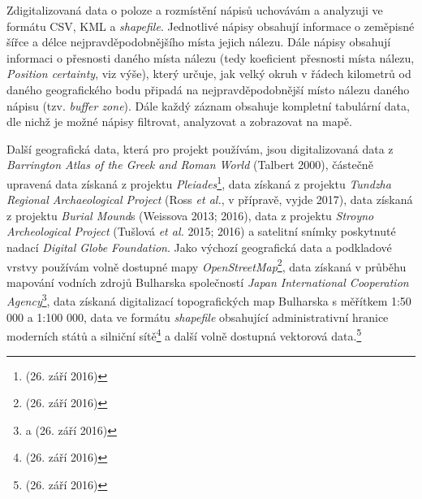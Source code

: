 Zdigitalizovaná data o poloze a rozmístění nápisů uchovávám a analyzuji ve formátu CSV, KML a {\em shapefile}. Jednotlivé nápisy obsahují informace o zeměpisné šířce a délce nejpravděpodobnějšího místa jejich nálezu. Dále nápisy obsahují informaci o přesnosti daného místa nálezu (tedy koeficient přesnosti místa nálezu, {\em Position certainty}, viz výše), který určuje, jak velký okruh v řádech kilometrů od daného geografického bodu připadá na nejpravděpodobnější místo nálezu daného nápisu (tzv. {\em buffer zone}). Dále každý záznam obsahuje kompletní tabulární data, dle nichž je možné nápisy filtrovat, analyzovat a zobrazovat na mapě.

Další geografická data, která pro projekt používám, jsou digitalizovaná data z {\em Barrington Atlas of the Greek and Roman World} (Talbert 2000), částečně upravená data získaná z projektu {\em Pleiades}\footnote{\from[url9] (26. září 2016)}, data získaná z projektu {\em Tundzha Regional Archaeological Project} (Ross {\em et al.}, v přípravě, vyjde 2017), data získaná z projektu {\em Burial Mound}s (Weissova 2013; 2016), data z projektu {\em Stroyno Archeological Project} (Tušlová {\em et al.} 2015; 2016) a satelitní snímky poskytnuté nadací {\em Digital Globe Foundation}. Jako výchozí geografická data a podkladové vrstvy používám volně dostupné mapy {\em OpenStreetMap}\footnote{\from[url10] (26. září 2016)}, data získaná v průběhu mapování vodních zdrojů Bulharska společností {\em Japan International Cooperation Agency}\footnote{\from[url11] a \from[url12] (26. září 2016)}, data získaná digitalizací topografických map Bulharska s měřítkem 1:50 000 a 1:100 000, data ve formátu {\em shapefile} obsahující administrativní hranice moderních států a silniční sítě\footnote{\from[url13] (26. září 2016)} a další volně dostupná vektorová data.\footnote{\from[url14] (26. září 2016)}

